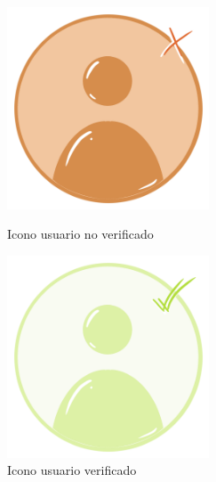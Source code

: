 \documentclass[a4paper, 12pt]{article}
\begin{document}
\begin{figure}[H]
   	\begin{minipage}{0.48\textwidth}
		\begin{center}
			{\includegraphics[width=6cm]{logo/USERNV.png}\par}
			\caption{Icono usuario no verificado}
		\end{center}  
	\end{minipage}\hfill
   	\begin{minipage}{0.48\textwidth}
		\begin{center}
			{\includegraphics[width=6cm]{logo/USERV.png}\par}
			\caption{Icono usuario verificado}
		\end{center}  
	\end{minipage}\hfill
\end{figure}
\end{document}
